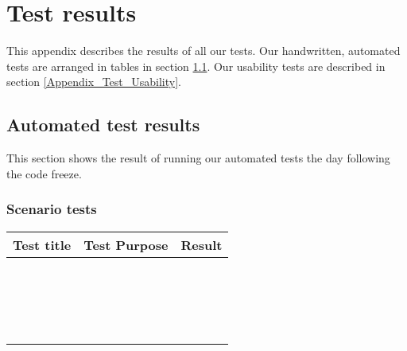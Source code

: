 \chapter{Test results}
\label{Appendix_Test}
This appendix describes the results of all our tests. Our handwritten, automated tests are arranged in tables in section \ref{Appendix_Test_Table}. Our usability tests are described in section \ref{Appendix_Test_Usability}.
\section{Automated test results}
\label{Appendix_Test_Table}
This section shows the result of running our automated tests the day following the code freeze.
\subsection{Scenario tests}
\label{Appendix_Test_Table_Scenario}
\begin{centering}
\begin{longtable}{| p{5 cm} | p{7 cm} | c |}
\hline
Test title & Test Purpose & Result\\
\hline
 & & \\
\hline
 & & \\
\hline
 & & \\
\hline
 & & \\
\hline
 & & \\
\hline
 & & \\
\hline
 & & \\
\hline
 & & \\
\hline
 & & \\
\hline
 & & \\
\hline
 & & \\
\hline
 & & \\
\hline
 & & \\
\hline
 & & \\
\hline
 & & \\
\hline
 & & \\
\hline
 & & \\
\hline
 & & \\
\hline
\end{longtable}
\end{centering}
